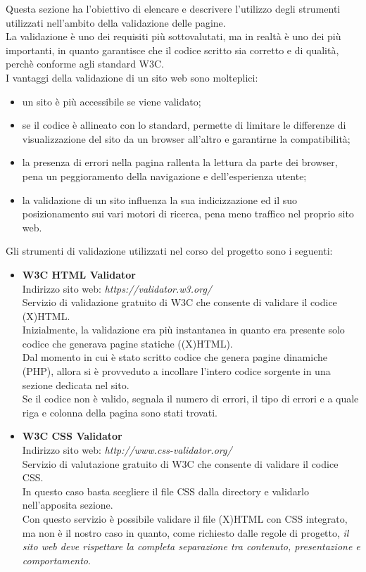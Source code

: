 Questa sezione ha l'obiettivo di elencare e descrivere l'utilizzo degli strumenti utilizzati nell'ambito della validazione delle pagine.\\ 
La validazione è uno dei requisiti più sottovalutati, ma in realtà è uno dei più importanti, in quanto garantisce che il codice scritto sia corretto e di qualità, perchè conforme agli standard W3C.\\
I vantaggi della validazione di un sito web sono molteplici:
\begin{itemize}
	\item un sito è più accessibile se viene validato;
	\item se il codice è allineato con lo standard, permette di limitare le differenze di visualizzazione del sito da un browser all'altro e garantirne la compatibilità;
	\item la presenza di errori nella pagina rallenta la lettura da parte dei browser, pena un peggioramento della navigazione e dell'esperienza utente;
	\item la validazione di un sito influenza la sua indicizzazione ed il suo posizionamento sui vari motori di ricerca, pena meno traffico nel proprio sito web.  
\end{itemize}
Gli strumenti di validazione utilizzati nel corso del progetto sono i seguenti:
\begin{itemize}
	\item \textbf{W3C HTML Validator}\\
	Indirizzo sito web: \emph{https://validator.w3.org/}\\
	Servizio di validazione gratuito di W3C che consente di validare il codice (X)HTML.\\ 
	Inizialmente, la validazione era più instantanea in quanto era presente solo codice che generava pagine statiche ((X)HTML).\\Dal momento in cui è stato scritto codice che genera pagine dinamiche (PHP), allora si è provveduto a incollare l'intero codice sorgente in una sezione dedicata nel sito.\\
	Se il codice non è valido, segnala il numero di errori, il tipo di errori e a quale riga e colonna della pagina sono stati trovati.
	\item \textbf{W3C CSS Validator}\\
	Indirizzo sito web: \emph{http://www.css-validator.org/}\\
	Servizio di valutazione gratuito di W3C che consente di validare il codice CSS.\\
	In questo caso basta scegliere il file CSS dalla directory e validarlo nell'apposita sezione.\\
	Con questo servizio è possibile validare il file (X)HTML con CSS integrato, ma non è il nostro caso in quanto, come richiesto dalle regole di progetto, \emph{il sito web deve rispettare la completa separazione tra contenuto, presentazione e comportamento}. 
\end{itemize}

 